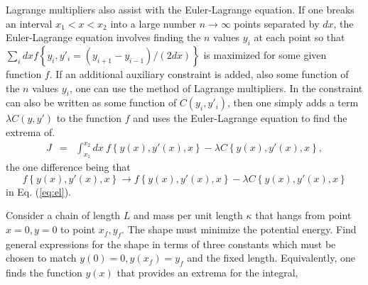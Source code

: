 \exampleend

Lagrange multipliers also assist with the Euler-Lagrange equation. If
one breaks an interval $x_1<x<x_2$ into a large number
$n\rightarrow\infty$ points separated by $dx$, the Euler-Lagrange
equation involves finding the $n$ values $y_i$ at each point so that
$\sum_i dx f\left\{y_i,y'_i=(y_{i+1}-y_{i-1})/(2dx)\right\}$ is
maximized for some given function $f$. If an additional auxiliary
constraint is added, also some function of the $n$ values $y_i$, one
can use the method of Lagrange multipliers. In the constraint can also
be written as some function of $C(y_i,y'_i)$, then one simply adds a
term $\lambda C(y,y')$ to the function $f$ and uses the Euler-Lagrange
equation to find the extrema of.
\begin{eqnarray}
J&=&\int_{x_1}^{x_2}dx~f\left\{y(x),y'(x),x\right\}-\lambda
C\left\{y(x),y'(x),x\right\},
\end{eqnarray}
the one difference being that
\begin{equation}
f\left\{y(x),y'(x),x\right\}\rightarrow
f\left\{y(x),y'(x),x\right\}-\lambda C\left\{y(x),y'(x),x\right\}
\end{equation}
in Eq. (\ref{eq:el}).

\example Consider a chain of length $L$ and mass per unit length
$\kappa$ that hangs from point $x=0,y=0$ to point $x_f,y_f$. The shape
must minimize the potential energy. Find general expressions for the
shape in terms of three constants which must be chosen to match
$y(0)=0, y(x_f)=y_f$ and the fixed length. Equivalently, one finds the
function $y(x)$ that provides an extrema for the integral,

